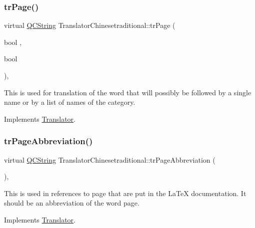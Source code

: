 \subsubsection{\texorpdfstring{trPage()}{trPage()}}
{\footnotesize\ttfamily virtual \mbox{\hyperlink{class_q_c_string}{Q\+C\+String}} Translator\+Chinesetraditional\+::tr\+Page (\begin{DoxyParamCaption}\item[{bool}]{,  }\item[{bool}]{ }\end{DoxyParamCaption})\hspace{0.3cm}{\ttfamily [inline]}, {\ttfamily [virtual]}}

This is used for translation of the word that will possibly be followed by a single name or by a list of names of the category. 

Implements \mbox{\hyperlink{class_translator}{Translator}}.

\mbox{\label{class_translator_chinesetraditional_a18084cdddd1baa4210092fc99e8f6438}} 
\subsubsection{\texorpdfstring{trPageAbbreviation()}{trPageAbbreviation()}}
{\footnotesize\ttfamily virtual \mbox{\hyperlink{class_q_c_string}{Q\+C\+String}} Translator\+Chinesetraditional\+::tr\+Page\+Abbreviation (\begin{DoxyParamCaption}{ }\end{DoxyParamCaption})\hspace{0.3cm}{\ttfamily [inline]}, {\ttfamily [virtual]}}

This is used in references to page that are put in the La\+TeX documentation. It should be an abbreviation of the word page. 

Implements \mbox{\hyperlink{class_translator}{Translator}}.

\mbox{\label{class_translator_chinesetraditional_a994ce609d694ebc1b7fcd8bc8b578d02}} 
